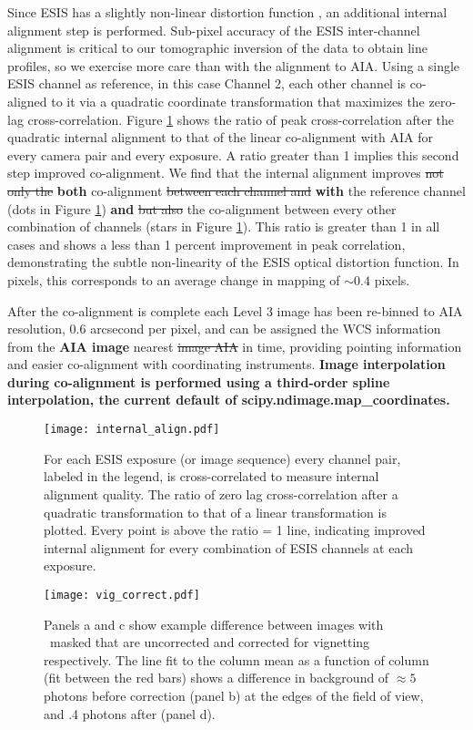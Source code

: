 Since ESIS has a slightly non-linear distortion function \citep{ESIS}, an additional internal alignment step is performed. 
Sub-pixel accuracy of the ESIS inter-channel alignment is critical to our tomographic inversion of the data to obtain line profiles, so we exercise more care than with the alignment to AIA.
Using a single ESIS channel as reference, in this case Channel 2, each other channel is co-aligned to it via a quadratic coordinate transformation that maximizes the zero-lag cross-correlation. 
Figure \ref{fig:cc} shows the ratio of peak cross-correlation after the quadratic internal alignment to that of the linear co-alignment with AIA for every camera pair and every exposure.
A ratio greater than 1 implies this second step improved co-alignment.
We find that the internal alignment improves \sout{not only the} \textbf{both} co-alignment \sout{between each channel and} \textbf{with} the reference channel (dots in Figure \ref{fig:cc}) \textbf{and} \sout{but also} the co-alignment between every other combination of channels (stars in Figure \ref{fig:cc}).
This ratio is greater than 1 in all cases and shows a less than 1 percent improvement in peak correlation, demonstrating the subtle non-linearity of the ESIS optical distortion function.
In pixels, this corresponds to an average change in mapping of $\sim 0.4$ pixels.

After the co-alignment is complete each Level 3 image has been re-binned to AIA resolution, 0.6 arcsecond per pixel, and can be assigned the WCS information \citep{WCS} from the \textbf{AIA image} nearest \sout{image AIA} in time, providing pointing information and easier co-alignment with coordinating instruments.
\textbf{Image interpolation during co-alignment is performed using a third-order spline interpolation, the current default of scipy.ndimage.map\_coordinates.}



 \begin{figure}
	\centering
	\texttt{[image: internal\_align.pdf]}
	\caption{For each ESIS exposure (or image sequence) every channel pair, labeled in the legend, is cross-correlated to measure internal alignment quality.  The ratio of zero lag cross-correlation after a quadratic transformation to that of a linear transformation is plotted.  Every point is above the ratio = 1 line, indicating improved internal alignment for every combination of ESIS channels at each exposure.}
	\label{fig:cc}	
\end{figure}

 \begin{figure}
	\centering
	\texttt{[image: vig\_correct.pdf]}
	\caption{Panels a and c show example difference between images with \mgxbright \ masked that are uncorrected and corrected for vignetting respectively.  The line fit to the column mean as a function of column (fit between the red bars) shows a difference in background of $\approx 5$ photons before correction (panel b) at the edges of the field of view, and .4 photons after (panel d). }
	\label{fig:vig_correct}
\end{figure}


